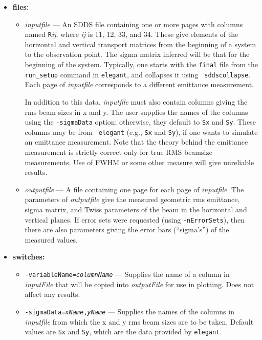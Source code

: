 \documentclass[11pt]{article}
\begin{document}
\begin{itemize}
\item {\bf files:}
\begin{itemize}

\item {\em inputfile} --- An SDDS file containing one or more pages
with columns named \verb|R|{\em ij}, where {\em ij} is 11, 12, 33, and
34.  These give elements of the horizontal and vertical transport
matrices from the beginning of a system to the observation point.  The
sigma matrix inferred will be that for the beginning of the system.
Typically, one starts with the {\tt final} file from the {\tt
run\_setup} command in {\tt elegant}, and collapses it using {\tt
sddscollapse}.  Each page of {\em inputfile} corresponds to a different
emittance measurement.

In addition to this data, {\em inputfile} must also contain columns
giving the rms beam sizes in x and y.  The user supplies the names of
the columns using the \verb|-sigmaData| option; otherwise, they
default to \verb|Sx| and \verb|Sy|.  These columns may be from {\tt
elegant} (e.g., \verb|Sx| and \verb|Sy|), if one wants to simulate an
emittance measurement.  Note that the theory behind the emittance
measurement is strictly correct only for true RMS beamsize
measurements.  Use of FWHM or some other measure will give unreliable
results.
 
\item {\em outputfile} --- A file containing one page for each page of
{\em inputfile}.  The parameters of {\em outputfile} give the measured
geometric rms emittance, sigma matrix, and Twiss parameters of the 
beam in the horizontal and vertical planes.  If error sets were requested
(using \verb|-nErrorSets|), then there are also parameters giving the
error bars (``sigma's'') of the measured values.

\end{itemize}

\item {\bf switches:}
\begin{itemize}

\item {\tt -variableName={\em columnName}} --- Supplies the name of
 a column in {\em inputFile} that will be copied into {\em outputFile}
 for use in plotting. Does not affect any results.

\item {\tt -sigmaData={\em xName},{\em yName}} --- Supplies the names
of the columns in {\em inputfile} from which the x and y rms beam
sizes are to be taken.  Default values are {\tt Sx} and {\tt Sy},
which are the data provided by {\tt elegant}.


\end{itemize}
\end{itemize}
\end{document}
